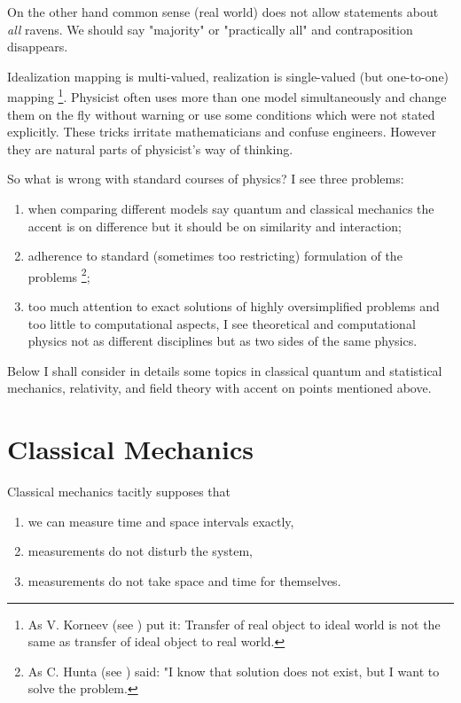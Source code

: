 \documentclass[11pt]{book}
\begin{document}
On the other hand common sense (real world) does not allow statements about {\em all} ravens. We should say "majority" or "practically all" and  contraposition  disappears.

Idealization mapping is multi-valued, realization is single-valued (but one-to-one) mapping \footnote{As V. Korneev (see \cite{strugatsky}) put it: Transfer of real object to ideal world
is not the same as transfer of ideal object to real world.}. Physicist often uses more than one model simultaneously and change them on the fly without warning or use some conditions which were not stated explicitly. These tricks irritate mathematicians and confuse engineers. However they are natural parts of physicist's way of thinking.

So what is wrong with standard courses of physics? I see three problems:
\begin{enumerate}
    \item when comparing different models say quantum and classical mechanics the accent is 
        on difference but it should be on similarity and interaction;
    \item adherence to standard (sometimes too restricting) formulation of the problems \footnote{As C. Hunta (see \cite{strugatsky}) said: "I know that solution does not exist, but I want to solve the problem.};
    \item too much attention to exact solutions of highly oversimplified problems and too little to computational aspects, I see theoretical and computational physics not as different disciplines but as two sides of the same physics.
\end{enumerate}



Below I shall consider in details some topics in classical quantum and statistical mechanics, relativity, and field theory with accent on points mentioned above.

\chapter{Classical Mechanics}
\label{class-mech}
Classical mechanics tacitly supposes that
\begin{enumerate}
    \item we can measure time and space intervals exactly,
    \item measurements do not disturb the system,
    \item measurements do not take space and time for themselves.
\end{enumerate}
\end{document}
